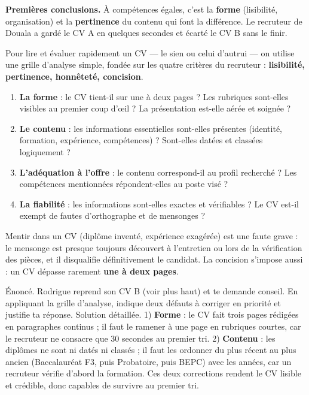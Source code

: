\documentclass[11pt]{article}
\newcounter{popsec}
\newcounter{popsub}
\newcommand{\courssub}[1]{%
  \stepcounter{popsub}%
  \par\vspace{9pt}\noindent{\popxbold\fontsize{11.5}{13}\selectfont\color{popink}{\color{poporange}\thepopsec.\thepopsub}\hspace{6pt}#1}\par\nopagebreak\vspace{4pt}
}
\begin{document}
\textbf{Premières conclusions.} À compétences égales, c'est la \textbf{forme} (lisibilité, organisation) et la \textbf{pertinence} du contenu qui font la différence. Le recruteur de Douala a gardé le CV A en quelques secondes et écarté le CV B sans le finir.

\courssub{Comment un recruteur apprécie-t-il un CV ?}

Pour lire et évaluer rapidement un CV — le sien ou celui d'autrui — on utilise une grille d'analyse simple, fondée sur les quatre critères du recruteur : \textbf{lisibilité, pertinence, honnêteté, concision}.

\begin{methode}
\begin{enumerate}
\item \textbf{La forme} : le CV tient-il sur une à deux pages ? Les rubriques sont-elles visibles au premier coup d'œil ? La présentation est-elle aérée et soignée ?
\item \textbf{Le contenu} : les informations essentielles sont-elles présentes (identité, formation, expérience, compétences) ? Sont-elles datées et classées logiquement ?
\item \textbf{L'adéquation à l'offre} : le contenu correspond-il au profil recherché ? Les compétences mentionnées répondent-elles au poste visé ?
\item \textbf{La fiabilité} : les informations sont-elles exactes et vérifiables ? Le CV est-il exempt de fautes d'orthographe et de mensonges ?
\end{enumerate}
\end{methode}

\begin{attention}
Mentir dans un CV (diplôme inventé, expérience exagérée) est une faute grave : le mensonge est presque toujours découvert à l'entretien ou lors de la vérification des pièces, et il disqualifie définitivement le candidat. La concision s'impose aussi : un CV dépasse rarement \textbf{une à deux pages}.
\end{attention}

\begin{exoresolu}
Énoncé. Rodrigue reprend son CV B (voir plus haut) et te demande conseil. En appliquant la grille d'analyse, indique deux défauts à corriger en priorité et justifie ta réponse.
\tcblower
Solution détaillée. 1) \textbf{Forme} : le CV fait trois pages rédigées en paragraphes continus ; il faut le ramener à une page en rubriques courtes, car le recruteur ne consacre que 30 secondes au premier tri. 2) \textbf{Contenu} : les diplômes ne sont ni datés ni classés ; il faut les ordonner du plus récent au plus ancien (Baccalauréat F3, puis Probatoire, puis BEPC) avec les années, car un recruteur vérifie d'abord la formation. Ces deux corrections rendent le CV lisible et crédible, donc capables de survivre au premier tri.
\end{exoresolu}
\end{document}
